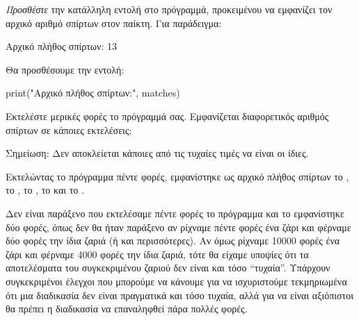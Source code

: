 \documentclass[a4paper,11pt,oneside]{book}
\begin{document}
\begin{step}
\emph{Προσθέστε} την κατάλληλη εντολή στο πρόγραμμά, προκειμένου να εμφανίζει τον αρχικό αριθμό σπίρτων στον παίκτη. Για παράδειγμα:

\marginnote[14pt]{\iconcomputer}
\begin{pyterm}
Αρχικό πλήθος σπίρτων: 13
\end{pyterm}

\begin{answer}
Θα προσθέσουμε την εντολή:

\begin{pynew}
print("Αρχικό πλήθος σπίρτων:", matches)
\end{pynew}
\end{answer}

Εκτελέστε μερικές φορές το πρόγραμμά σας. Εμφανίζεται διαφορετικός αριθμός σπίρτων σε κάποιες εκτελέσεις; 

\begin{note}
Σημείωση: Δεν αποκλείεται κάποιες από τις τυχαίες τιμές να είναι οι ίδιες.
\end{note}

\begin{answer}
Εκτελώντας το πρόγραμμα πέντε φορές, εμφανίστηκε ως αρχικό πλήθος σπίρτων το , το , το , το  και το . 

Δεν είναι παράξενο που εκτελέσαμε πέντε φορές το πρόγραμμα και το  εμφανίστηκε δύο φορές, όπως δεν θα ήταν παράξενο αν ρίχναμε πέντε φορές ένα ζάρι και φέρναμε δύο φορές την ίδια ζαριά (ή και περισσότερες). Αν όμως ρίχναμε 10000 φορές ένα ζάρι και φέρναμε 4000 φορές την ίδια ζαριά, τότε θα είχαμε υποψίες ότι τα αποτελέσματα του συγκεκριμένου ζαριού δεν είναι και τόσο ``τυχαία''. Υπάρχουν συγκεκριμένοι έλεγχοι που μπορούμε να κάνουμε για να ισχυριστούμε τεκμηριωμένα ότι μια διαδικασία δεν είναι πραγματικά και τόσο τυχαία, αλλά για να είναι αξιόπιστοι θα πρέπει η διαδικασία να επαναληφθεί πάρα πολλές φορές. 
\end{answer}

\end{step}
\end{document}
